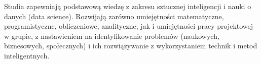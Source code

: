 Studia zapewniają podstawową wiedzę z zakresu sztucznej inteligencji i nauki o danych (data science). Rozwijają zarówno umiejętności matematyczne, programistyczne, obliczeniowe, analityczne, jak i umiejętności pracy projektowej w grupie, z nastawieniem na identyfikowanie problemów (naukowych, biznesowych, społecznych) i ich rozwiązywanie z wykorzystaniem technik i metod inteligentnych.